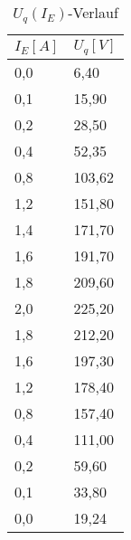 \begin{table}[htbp]
      \centering
      \begin{tabularx}{\columnwidth}{XX}
            \toprule
            $I_E[A]$ & $U_q[V]$ \\
            \midrule
            0,0      & 6,40     \\
            0,1      & 15,90    \\
            0,2      & 28,50    \\
            0,4      & 52,35    \\
            0,8      & 103,62   \\
            1,2      & 151,80   \\
            1,4      & 171,70   \\
            1,6      & 191,70   \\
            1,8      & 209,60   \\
            2,0      & 225,20   \\
            1,8      & 212,20   \\
            1,6      & 197,30   \\
            1,2      & 178,40   \\
            0,8      & 157,40   \\
            0,4      & 111,00   \\
            0,2      & 59,60    \\
            0,1      & 33,80    \\
            0,0      & 19,24    \\
            \bottomrule
      \end{tabularx}
      \caption{$U_q(I_E)$-Verlauf}
\end{table}
